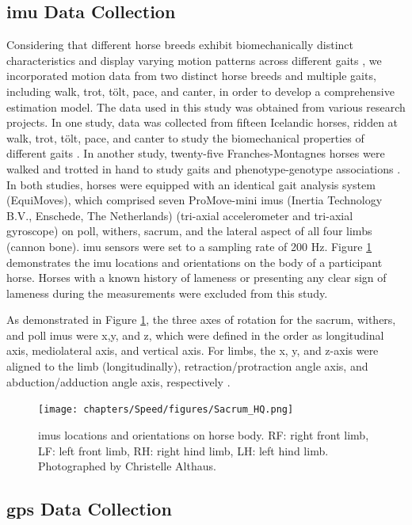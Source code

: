 \subsection{\gls{imu} Data Collection}
Considering that different horse breeds exhibit biomechanically distinct characteristics and display varying motion patterns across different gaits \cite{faber,CANO2001147,Robilliard187}, we incorporated motion data from two distinct horse breeds and multiple gaits, including walk, trot, tölt, pace, and canter, in order to develop a comprehensive estimation model. The data used in this study was obtained from various research projects. In one study, data was collected from fifteen Icelandic horses, ridden at walk, trot, tölt, pace, and canter to study the biomechanical properties of different gaits \cite{gunnarsson_2018_objective}. In another study, twenty-five Franches-Montagnes horses were walked and trotted in hand to study gaits and phenotype-genotype associations \cite{franches}. In both studies, horses were equipped with an identical gait analysis system (EquiMoves), which comprised seven ProMove-mini \gls{imu}s (Inertia Technology B.V., Enschede, The Netherlands) (tri-axial accelerometer and tri-axial gyroscope) \cite{456,articsasasasle} on poll, withers, sacrum, and the lateral aspect of all four limbs (cannon bone). \gls{imu} sensors were set to a sampling rate of 200 Hz. Figure \ref{fig:speed_IMUplacement} demonstrates the \gls{imu} locations and orientations on the body of a participant horse. Horses with a known history of lameness or presenting any clear sign of lameness during the measurements were excluded from this study.

As demonstrated in Figure \ref{fig:speed_IMUplacement}, the three axes of rotation for the sacrum, withers, and poll \gls{imu}s were x,y, and z, which were defined in the order as longitudinal axis, mediolateral axis, and vertical axis. For limbs, the x, y, and z-axis were aligned to the limb (longitudinally), retraction/protraction angle axis, and abduction/adduction angle axis, respectively \cite{456}.  

\begin{figure}[htb]
\centering
\texttt{[image: chapters/Speed/figures/Sacrum\_HQ.png]}
\caption{\gls{imu}s locations and orientations on horse body. {RF: right front limb, LF: left front limb, RH: right hind limb, LH: left hind limb}.  {Photographed by Christelle Althaus.}}
\label{fig:speed_IMUplacement}
\end{figure}

\subsection{\gls{gps} Data Collection}
\label{sec:gpsvalsection}

